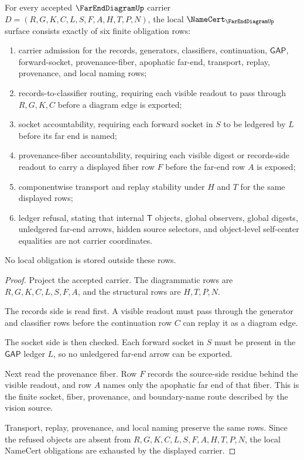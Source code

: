 \begin{theorem}
\label{thm:far-end-diagram-packet-namecert-obligations}
For every accepted $\FarEndDiagramUp$ carrier $D=(R,G,K,C,L,S,F,A,H,T,P,N)$, the local $\NameCert_{\FarEndDiagramUp}$ surface consists exactly of six finite obligation rows:
\begin{enumerate}
\item carrier admission for the records, generators, classifiers, continuation, $\mathsf{GAP}$, forward-socket, provenance-fiber, apophatic far-end, transport, replay, provenance, and local naming rows;
\item records-to-classifier routing, requiring each visible readout to pass through $R,G,K,C$ before a diagram edge is exported;
\item socket accountability, requiring each forward socket in $S$ to be ledgered by $L$ before its far end is named;
\item provenance-fiber accountability, requiring each visible digest or records-side readout to carry a displayed fiber row $F$ before the far-end row $A$ is exposed;
\item componentwise transport and replay stability under $H$ and $T$ for the same displayed rows;
\item ledger refusal, stating that internal $\mathsf{T}$ objects, global observers, global digests, unledgered far-end arrows, hidden source selectors, and object-level self-center equalities are not carrier coordinates.
\end{enumerate}
No local obligation is stored outside these rows.
\end{theorem}
\begin{proof}
Project the accepted carrier. The diagrammatic rows are $R,G,K,C,L,S,F,A$, and the structural rows are $H,T,P,N$.

The records side is read first. A visible readout must pass through the generator and classifier rows before the continuation row $C$ can replay it as a diagram edge.

The socket side is then checked. Each forward socket in $S$ must be present in the $\mathsf{GAP}$ ledger $L$, so no unledgered far-end arrow can be exported.

Next read the provenance fiber. Row $F$ records the source-side residue behind the visible readout, and row $A$ names only the apophatic far end of that fiber. This is the finite socket, fiber, provenance, and boundary-name route described by the vision source.

Transport, replay, provenance, and local naming preserve the same rows. Since the refused objects are absent from $R,G,K,C,L,S,F,A,H,T,P,N$, the local NameCert obligations are exhausted by the displayed carrier.
\end{proof}

